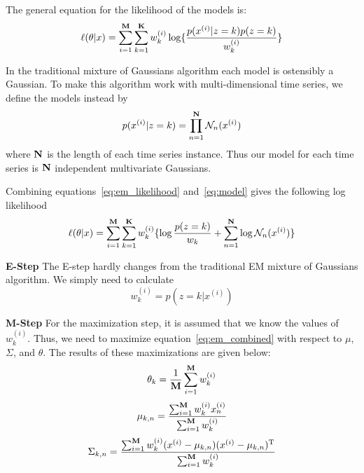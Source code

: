 The general equation for the likelihood of the models is: 
\begin{equation}
\label{eq:em_likelihood}
\ell(\theta|x) = \sum_{i = 1}^{{\bf M}}\sum_{k = 1}^{{\bf K}}w_{k}^{(i)}\log \{ \frac{p(x^{(i)}|z=k)p(z = k)}{w_{k}^{(i)}} \}
\end{equation}

In the traditional mixture of Gaussians algorithm each model is ostensibly a Gaussian.  To make this algorithm work with multi-dimensional time series, we define the models instead by
\begin{equation}
\label{eq:model}
p(x^{(i)}|z = k) = \prod_{n = 1}^{{\bf N}}\mathcal{N}_{n}(x^{(i)})
\end{equation}
\noindent
where ${\bf N}$ is the length of each time series instance.  Thus our model for each time series is ${\bf N}$ independent multivariate Gaussians.

Combining equations~\ref{eq:em_likelihood} and~\ref{eq:model} gives the following log likelihood
\begin{equation}
\label{eq:em_combined}
\ell(\theta|x) = \sum_{i = 1}^{{\bf M}}\sum_{k = 1}^{{\bf K}}w_{k}^{(i)}\{ \log\frac{p(z = k)}{w_{k}} + \sum_{n = 1}^{{\bf N}} \log \mathcal{N}_{n}(x^{(i)})\}
\end{equation}

\textbf{E-Step}
The E-step hardly changes from the traditional EM mixture of Gaussians algorithm.  We simply need to calculate 
\begin{equation}
w^{(i)}_{k} = p(z = k|x^{(i)})
\end{equation}

\textbf{M-Step}
For the maximization step, it is assumed that we know the values of $w_{k}^{(i)}$.  Thus, we need to maximize equation~\ref{eq:em_combined} with respect to $\mu$,  $\Sigma$, and $\theta$.
The results of these maximizations are given below:
\begin{equation}
\theta_{k} = \frac{1}{{\bf M}}\sum_{i = 1}^{{\bf M}}w_{k}^{(i)}
\end{equation}
\begin{equation}
\mu_{k, n} = \frac{\sum_{i = 1}^{{\bf M}}w_{k}^{(i)}x^{(i)}_{n}}{\sum_{i = 1}^{{\bf M}}w_{k}^{(i)}}
\end{equation}
\begin{equation}
\Sigma_{k, n} = \frac{\sum_{i = 1}^{{\bf M}}w_{k}^{(i)}(x^{(i)} - \mu_{k, n})(x^{(i)} - \mu_{k, n})^{\mathrm{T}}}{\sum_{i = 1}^{{\bf M}}w_{k}^{(i)}}
\end{equation}


